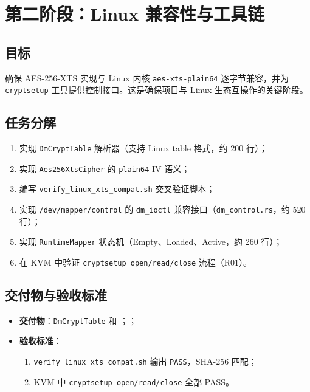 \section{第二阶段：Linux 兼容性与工具链}

\subsection{目标}
确保 AES-256-XTS 实现与 Linux 内核 \texttt{aes-xts-plain64} 逐字节兼容，并为 \texttt{cryptsetup} 工具提供控制接口。这是确保项目与 Linux 生态互操作的关键阶段。

\subsection{任务分解}
\begin{enumerate}
    \item 实现 \texttt{DmCryptTable} 解析器（支持 Linux table 格式，约 200 行）；
    \item 实现 \texttt{Aes256XtsCipher} 的 \texttt{plain64} IV 语义；
    \item 编写 \texttt{verify\_linux\_xts\_compat.sh} 交叉验证脚本；
    \item 实现 \texttt{/dev/mapper/control} 的 \texttt{dm\_ioctl} 兼容接口（\texttt{dm\_control.rs}，约 520 行）；
    \item 实现 \texttt{RuntimeMapper} 状态机（Empty、Loaded、Active，约 260 行）；
    \item 在 KVM 中验证 \texttt{cryptsetup open/read/close} 流程（R01）。
\end{enumerate}

\subsection{交付物与验收标准}
\begin{itemize}
    \item \textbf{交付物}：\texttt{DmCryptTable} 和 \texttt{}；\texttt{}；\texttt{}
    \item \textbf{验收标准}：
    \begin{enumerate}
        \item \texttt{verify\_linux\_xts\_compat.sh} 输出 \texttt{PASS}，SHA-256 匹配；
        \item KVM 中 \texttt{cryptsetup open/read/close} 全部 PASS。
    \end{enumerate}
\end{itemize}

